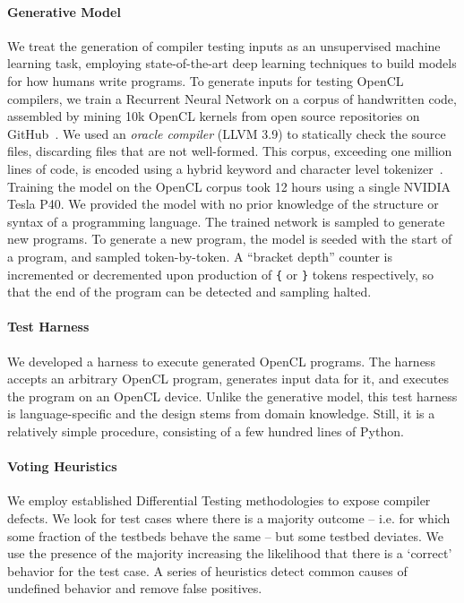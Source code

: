 \vspace{-.5em}
\paragraph{Generative Model} We treat the generation of compiler testing inputs as an unsupervised machine learning task, employing state-of-the-art deep learning techniques to build models for how humans write programs. To generate inputs for testing OpenCL compilers, we train a Recurrent Neural Network on a corpus of handwritten code, assembled by mining 10k OpenCL kernels from open source repositories on GitHub~\cite{Cummins2017a}. We used an \emph{oracle compiler} (LLVM 3.9) to statically check the source files, discarding files that are not well-formed. This corpus, exceeding one million lines of code, is encoded using a hybrid keyword and character level tokenizer~\cite{Cummins2017b}. Training the model on the OpenCL corpus took 12 hours using a single NVIDIA Tesla P40. We provided the model with no prior knowledge of the structure or syntax of a programming language. The trained network is sampled to generate new programs. To generate a new program, the model is seeded with the start of a program, and sampled token-by-token. A ``bracket depth'' counter is incremented or decremented upon production of \texttt{\{} or \texttt{\}} tokens respectively, so that the end of the program can be detected and sampling halted.

\vspace{-1em}
\paragraph{Test Harness} We developed a harness to execute generated OpenCL programs. The harness accepts an arbitrary OpenCL program, generates input data for it, and executes the program on an OpenCL device. Unlike the generative model, this test harness is language-specific and the design stems from domain knowledge. Still, it is a relatively simple procedure, consisting of a few hundred lines of Python.

\vspace{-1em}
\paragraph{Voting Heuristics} We employ established Differential Testing methodologies to expose compiler defects. We look for test cases where there is a majority outcome -- i.e. for which some fraction of the testbeds behave the same -- but some testbed deviates. We use the presence of the majority increasing the likelihood that there is a `correct' behavior for the test case. A series of heuristics detect common causes of undefined behavior and remove false positives.
